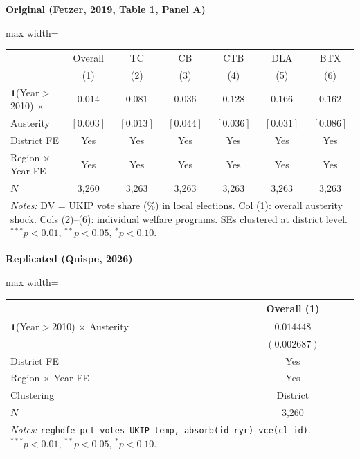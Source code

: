 \documentclass[11pt,a4paper]{article}
\begin{document}
\vspace{0.5cm}
\begin{minipage}[t]{0.48\textwidth}
\centering
\textbf{\large Original (Fetzer, 2019, Table 1, Panel A)}
\vspace{0.3cm}

\begin{adjustbox}{max width=\textwidth}
\begin{tabular}{lcccccc}
\toprule
 & Overall & TC & CB & CTB & DLA & BTX \\
 & (1) & (2) & (3) & (4) & (5) & (6) \\
\midrule
$\mathbf{1}$(Year$>$2010) $\times$ & $0.014$ & $0.081$ & $0.036$ & $0.128$ & $0.166$ & $0.162$ \\
\quad Austerity & $[0.003]$ & $[0.013]$ & $[0.044]$ & $[0.036]$ & $[0.031]$ & $[0.086]$ \\[0.3em]
\midrule
District FE & Yes & Yes & Yes & Yes & Yes & Yes \\
Region $\times$ Year FE & Yes & Yes & Yes & Yes & Yes & Yes \\
$N$ & 3,260 & 3,263 & 3,263 & 3,263 & 3,263 & 3,263 \\
\bottomrule
\multicolumn{7}{p{0.95\textwidth}}{\footnotesize\textit{Notes:} DV = UKIP vote share (\%) in local elections. Col (1): overall austerity shock. Cols (2)--(6): individual welfare programs. SEs clustered at district level. $^{***}p<0.01$, $^{**}p<0.05$, $^{*}p<0.10$.}
\end{tabular}
\end{adjustbox}
\end{minipage}%
\hfill
\begin{minipage}[t]{0.48\textwidth}
\centering
\textbf{\large Replicated (Quispe, 2026)}
\vspace{0.3cm}

\begin{adjustbox}{max width=\textwidth}
\begin{tabular}{lc}
\toprule
 & Overall (1) \\
\midrule
$\mathbf{1}$(Year$>$2010) $\times$ Austerity & $0.014448$ \\
 & $(0.002687)$ \\[0.3em]
\midrule
District FE & Yes \\
Region $\times$ Year FE & Yes \\
Clustering & District \\
$N$ & 3,260 \\
\bottomrule
\multicolumn{2}{p{0.95\textwidth}}{\footnotesize\textit{Notes:} \texttt{reghdfe pct\_votes\_UKIP temp, absorb(id ryr) vce(cl id)}. $^{***}p<0.01$, $^{**}p<0.05$, $^{*}p<0.10$.}
\end{tabular}
\end{adjustbox}
\end{minipage}
\end{document}
